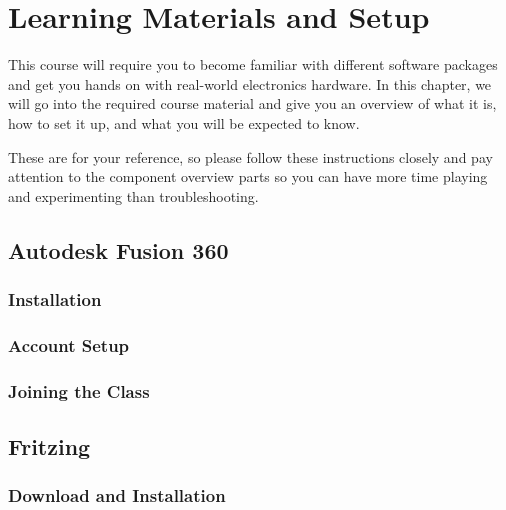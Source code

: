 %

\chapter*{Learning Materials and Setup}
\setchapterpreamble[u]{\margintoc}

This course will require you to become familiar with different software packages and get you hands on with real-world electronics hardware.
In this chapter, we will go into the required course material and give you an overview of what it is, how to set it up, and what you will be expected to know.

These are for your reference, so please follow these instructions closely and pay attention to the component overview parts so you can have more time playing and experimenting than troubleshooting.

\section*{Autodesk Fusion 360}

    \subsection*{Installation}

    \subsection*{Account Setup}

    \subsection*{Joining the Class}

\section*{Fritzing}

    \subsection*{Download and Installation}

